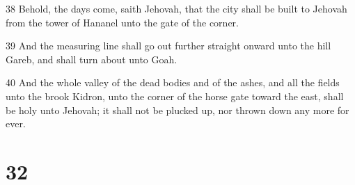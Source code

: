 \par 38 Behold, the days come, saith Jehovah, that the city shall be built to Jehovah from the tower of Hananel unto the gate of the corner.
\par 39 And the measuring line shall go out further straight onward unto the hill Gareb, and shall turn about unto Goah.
\par 40 And the whole valley of the dead bodies and of the ashes, and all the fields unto the brook Kidron, unto the corner of the horse gate toward the east, shall be holy unto Jehovah; it shall not be plucked up, nor thrown down any more for ever.

\chapter{32}

